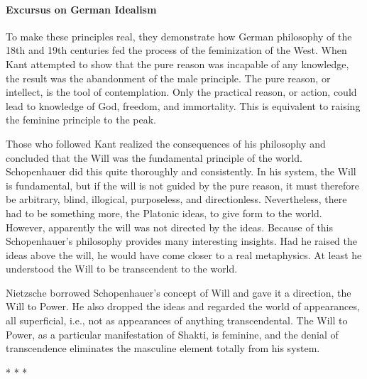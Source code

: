 \paragraph{Excursus on German Idealism}
To make these principles real, they demonstrate how German philosophy of the 18th and 19th centuries fed the process of the feminization of the West. When Kant attempted to show that the pure reason was incapable of any knowledge, the result was the abandonment of the male principle. The pure reason, or intellect, is the tool of contemplation. Only the practical reason, or action, could lead to knowledge of God, freedom, and immortality. This is equivalent to raising the feminine principle to the peak.

Those who followed Kant realized the consequences of his philosophy and concluded that the Will was the fundamental principle of the world. Schopenhauer did this quite thoroughly and consistently. In his system, the Will is fundamental, but if the will is not guided by the pure reason, it must therefore be arbitrary, blind, illogical, purposeless, and directionless. Nevertheless, there had to be something more, the Platonic ideas, to give form to the world. However, apparently the will was not directed by the ideas. Because of this Schopenhauer's philosophy provides many interesting insights. Had he raised the ideas above the will, he would have come closer to a real metaphysics. At least he understood the Will to be transcendent to the world.

Nietzsche borrowed Schopenhauer's concept of Will and gave it a direction, the Will to Power. He also dropped the ideas and regarded the world of appearances, all superficial, i.e., not as appearances of anything transcendental. The Will to Power, as a particular manifestation of Shakti, is feminine, and the denial of transcendence eliminates the masculine element totally from his system.




\begin{center}* * *\end{center}

